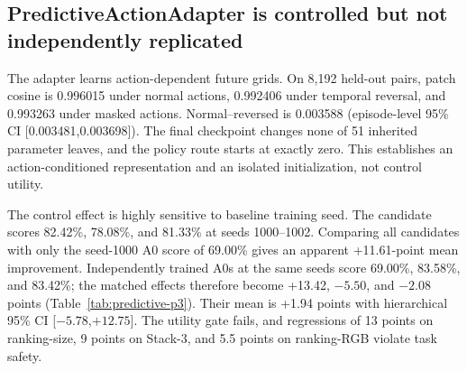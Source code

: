 \subsection{PredictiveActionAdapter is controlled but not independently replicated}
The adapter learns action-dependent future grids.  On 8,192 held-out pairs,
patch cosine is 0.996015 under normal actions, 0.992406 under temporal reversal,
and 0.993263 under masked actions.  Normal--reversed is 0.003588 (episode-level
95\% CI [0.003481,0.003698]).  The final checkpoint changes none of 51 inherited
parameter leaves, and the policy route starts at exactly zero.  This establishes
an action-conditioned representation and an isolated initialization, not
control utility.

The control effect is highly sensitive to baseline training seed.  The
candidate scores 82.42\%, 78.08\%, and 81.33\% at seeds 1000--1002.  Comparing
all candidates with only the seed-1000 A0 score of 69.00\% gives an apparent
+11.61-point mean improvement.  Independently trained A0s at the same seeds
score 69.00\%, 83.58\%, and 83.42\%; the matched effects therefore become
+13.42, $-5.50$, and $-2.08$ points (Table~\ref{tab:predictive-p3}).  Their mean
is +1.94 points with hierarchical 95\% CI [$-5.78$,$+12.75$].  The utility gate
fails, and regressions of 13 points on ranking-size, 9 points on Stack-3, and
5.5 points on ranking-RGB violate task safety.

\begin{table}[t]
\centering\small
\caption{PredictiveActionAdapter independent matched-baseline replication.
Each seed pairs 1,200 candidate and A0 episodes.  Task entries and Effect are
candidate-minus-A0 percentage points; the complete matrix exposes the
regressions hidden by the mean.}
\setlength{\tabcolsep}{3pt}
\label{tab:predictive-p3}
\end{table}

